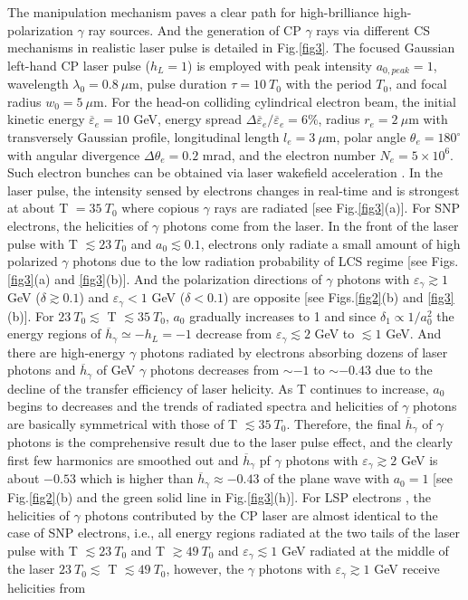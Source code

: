 \documentclass[10pt,twocolumn,showpacs,amsmath,amssymb,floatfix,superscriptaddress]{revtex4-2}
\begin{document}
The manipulation mechanism paves a clear path for high-brilliance high-polarization $\gamma$ ray sources. And the generation of CP $\gamma$ rays via different CS mechanisms in realistic laser pulse is detailed in Fig.\ref{fig3}. The focused Gaussian left-hand CP laser pulse ($h_L=1$) is employed with peak intensity $a_{0,peak}=1$, wavelength $\lambda_0 = 0.8 ~ \mu$m, pulse duration $\tau=10~T_0$ with the period $T_0$, and focal radius $w_0=5 ~ \mu$m. For the head-on colliding cylindrical electron beam, the initial kinetic energy $\overline{\varepsilon}_e=10$ GeV, energy spread $\Delta \overline{\varepsilon}_e / \overline{\varepsilon}_e=6\%$, radius $r_e = 2 ~ \mu$m with transversely Gaussian profile, longitudinal length $l_e = 3 ~ \mu$m, polar angle $\theta_e=180^\circ$ with angular divergence $\Delta \theta_e=0.2$ mrad, and the electron number $N_e=5\times10^6$. Such electron bunches can be obtained via laser wakefield acceleration \cite{Leemans2014,Xia2016,Gonsalves2019,LiF2022}. In the laser pulse, the intensity sensed by electrons changes in real-time and is strongest at about T $=35~T_0$ where copious $\gamma$ rays are radiated [see Fig.\ref{fig3}(a)].  For SNP electrons, the helicities of $\gamma$ photons come from the laser. In the front of the laser pulse with T $\lesssim 23~T_0$ and $a_0 \lesssim 0.1$, electrons only radiate a small amount of high polarized $\gamma$ photons due to the low radiation probability of LCS regime [see Figs.\ref{fig3}(a) and \ref{fig3}(b)]. And the polarization directions of $\gamma$ photons with $\varepsilon_\gamma \gtrsim 1$ GeV ($\delta \gtrsim 0.1$) and $\varepsilon_\gamma < 1$ GeV ($\delta < 0.1$) are opposite [see Figs.\ref{fig2}(b) and \ref{fig3}(b)]. For $23~T_0 \lesssim$ T $\lesssim 35~T_0$, $a_0$ gradually increases to 1 and since $\delta_1 \propto 1/a_0^2$ the energy regions of $\overline{h}_\gamma \simeq -h_L =-1$ decrease from $\varepsilon_\gamma \lesssim 2$ GeV to $\lesssim 1$ GeV. And there are high-energy $\gamma$ photons radiated by electrons absorbing dozens of laser photons and $\overline{h}_\gamma$ of GeV $\gamma$ photons decreases from $\sim -1$ to $\sim -0.43$ due to the decline of the transfer efficiency of laser helicity. As T continues to increase, $a_0$ begins to decreases and the trends of radiated spectra and helicities of $\gamma$ photons are basically symmetrical with those of T $\lesssim 35~T_0$. Therefore, the final $\overline{h}_\gamma$ of $\gamma$ photons is the comprehensive result due to the laser pulse effect, and the clearly first few harmonics are smoothed out and $\overline{h}_\gamma$ pf $\gamma$ photons with $\varepsilon_{\gamma} \gtrsim 2$ GeV is about $-0.53$ which is higher than $\overline{h}_\gamma \approx -0.43$ of the plane wave with $a_0=1$ [see Fig.\ref{fig2}(b) and the green solid line in Fig.\ref{fig3}(h)]. For LSP electrons \cite{Wen2019,Nie2021,Sun2022}, the helicities of $\gamma$ photons contributed by the CP laser are almost identical to the case of SNP electrons, i.e., all energy regions radiated at the two tails of the laser pulse with T $\lesssim 23~T_0$ and T $\gtrsim 49~T_0$ and $\varepsilon_\gamma \lesssim 1$ GeV radiated at the middle of the laser $23~T_0 \lesssim$ T $\lesssim 49~T_0$, however, the $\gamma$ photons with $\varepsilon_\gamma \gtrsim 1$ GeV receive helicities from 
\end{document}
